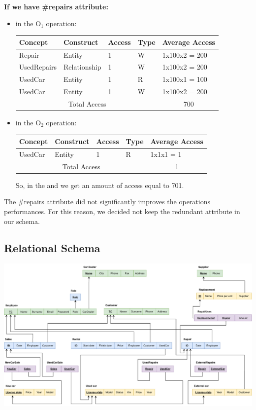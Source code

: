 \textbf{If we have \#repairs attribute:} 
\begin{itemize}
\item in the O$_1$ operation: 
\begin{longtable}{|p{}|p{}|p{}|p{}|p{}|}
	\hline
	\textbf{Concept} & \textbf{Construct} & \textbf{Access} & \textbf{Type} & \textbf{Average Access} \\
	\hline 
	Repair & Entity & 1 & W & 1x100x2 = 200 \\
	\hline
	UsedRepairs & Relationship & 1 & W & 1x100x2 = 200 \\
	\hline 
	UsedCar & Entity & 1 & R & 1x100x1 = 100 \\ 
	\hline 
	UsedCar & Entity & 1 & W & 1x100x2 = 200 \\ 
	\hline
	\multicolumn{4}{|c|}{Total Access} & \multicolumn{1}{c|}{700} \\
	\hline
\end{longtable}
\item in the O$_2$ operation: 
\begin{longtable}{|p{}|p{}|p{}|p{}|p{}|}
	\hline
	\textbf{Concept} & \textbf{Construct} & \textbf{Access} & \textbf{Type} & \textbf{Average Access} \\
	\hline 
	UsedCar & Entity & 1 & R & 1x1x1 = 1 \\ 
	\hline 
	\multicolumn{4}{|c|}{Total Access} & \multicolumn{1}{c|}{1} \\
	\hline
\end{longtable}
\vspace{-0.3cm}
So, in the and we get an amount of access equal to 701.
\end{itemize}

\noindent The \#repairs attribute did not significantly improves the operations performances. For this reason, we decided not keep the redundant attribute in our schema. 



\subsection{Relational Schema}
\includegraphics[scale=0.55]{relational_schema}


